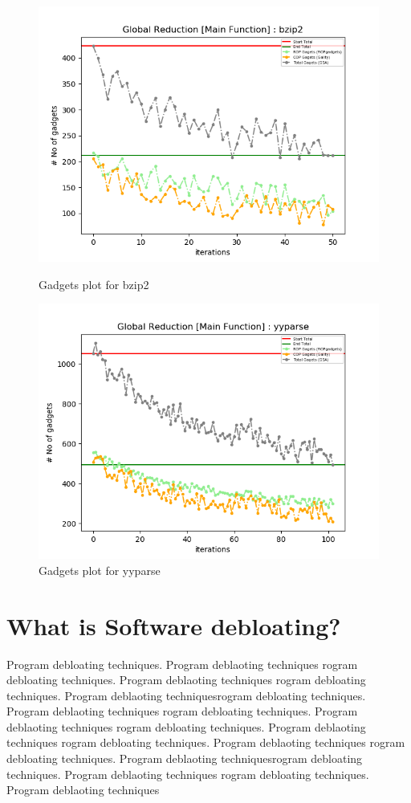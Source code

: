 \documentclass{relatorio}
\begin{document}
\begin{figure}[H]
		\includegraphics[width=0.65\linewidth]{imgs/chisel_gadgets_bzip2_plot.png}
		\caption{Gadgets plot for \color{blue} bzip2}%
		\label{fig:plant}
		\centering
		\captionsetup{justification=centering}
		\includegraphics[width=0.65\linewidth]{imgs/chisel_gadgets_yyparse_plot.png}
		\caption{Gadgets plot for \color{blue} yyparse}%
		\label{fig:plant}
	\end{figure}


\section{What is Software debloating?}%
\label{Tools}

Program debloating techniques. Program deblaoting techniques rogram debloating techniques. Program deblaoting techniques
rogram debloating techniques. Program deblaoting techniquesrogram debloating techniques. Program deblaoting techniques
rogram debloating techniques. Program deblaoting techniques rogram debloating techniques. Program deblaoting techniques
rogram debloating techniques. Program deblaoting techniques 
rogram debloating techniques. Program deblaoting techniquesrogram debloating techniques. Program deblaoting techniques
rogram debloating techniques. Program deblaoting techniques
\end{document}
